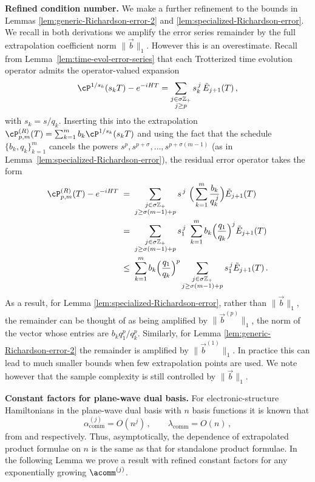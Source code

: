 \textbf{Refined condition number.} We make a further refinement to the bounds in Lemmas \ref{lem:generic-Richardson-error-2} and \ref{lem:specialized-Richardson-error}. We recall in both derivations we  amplify the error series remainder by the full extrapolation coefficient norm $\|\vec{b}\|_1$. However this is an overestimate. Recall from Lemma~\ref{lem:time-evol-error-series} that each Trotterized time evolution operator admits the operator-valued expansion
\begin{equation}\label{eq:trotter-series-recall}
\cP^{1/s_k}(s_k T) - e^{-iHT} = \sum_{\substack{j \in \sigma \mathbb{Z}_+\\
j \geq p}} s_{k}^{\,j}\, \tilde{E}_{j+1}(T)\,,
\end{equation} with $s_k =  s/ q_k$. Inserting this into the extrapolation $\cP^{(R)}_{p, m}(T) =  \sum_{k=1}^m b_k \cP^{1/s_k} (s_k T)$ and using the fact that the schedule $\{b_k, q_k\}_{k=1}^m$ cancels the powers $s^{p}, s^{p+\sigma}, \ldots, s^{p + \sigma (m-1)}$ (as in Lemma~\ref{lem:specialized-Richardson-error}), the residual error operator takes the form
\begin{align}\label{eq:tilde-b-bound}
\cP^{(R)}_{p, m}(T)- e^{-iHT}\;&=\;\sum_{\substack{j \in \sigma\mathbb{Z}_+ \\ j \geq \sigma(m-1)+p}} s^{\,j}\ \Big(\sum_{k=1}^{m} \frac{b_k}{q_k^{\,j}}\Big) \tilde{E}_{j+1}(T) \\
&= \;\sum_{\substack{j \in \sigma\mathbb{Z}_+ \\ j \geq \sigma(m-1)+p}} s_1^{\,j}\ \sum_{k=1}^{m} {b_k} \Big(\frac{q_1}{q_k}\Big)^{j} \tilde{E}_{j+1}(T) \\
&\leq \; \sum_{k=1}^{m} {b_k} \Big(\frac{q_1}{q_k}\Big)^{p} \sum_{\substack{j \in \sigma\mathbb{Z}_+ \\ j \geq \sigma(m-1)+p}} s_1^{\,j} \tilde{E}_{j+1}(T) \,.
\end{align}
As a result, for Lemma \ref{lem:specialized-Richardson-error}, rather than $\|\vec{b}\|_1$, the remainder can be thought of as being amplified by $\|\vec{b}^{(p)}\|_1$, the norm of the vector whose entries are $b_kq_1^p/q_k^p$. Similarly, for Lemma \ref{lem:generic-Richardson-error-2} the remainder is amplified by $\|\vec{b}^{(1)}\|_1$. In practice this can lead to much smaller bounds when few extrapolation points are used. We note however that the sample complexity is still controlled by $\|\vec{b}\|_1$.

\medskip

\textbf{Constant factors for plane-wave dual basis.} For electronic-structure Hamiltonians in the plane-wave dual basis with $n$ basis functions it is known that 
\begin{equation}\label{eq:comm-scaling-basic}
\alpha^{(j)}_{\text{comm}} = O(n^{j})\,,
\qquad
\lambda_{\text{comm}} = O(n)\,,
\end{equation}
from \cite{childs2021TheoryTrotter} and \cite{chakraborty2025quantum} respectively. Thus, asymptotically, the dependence of extrapolated product formulae on $n$ is the same as that for standalone product formulae. In the following Lemma we prove a result with refined constant factors for any exponentially growing $\acomm^{(j)}$.

